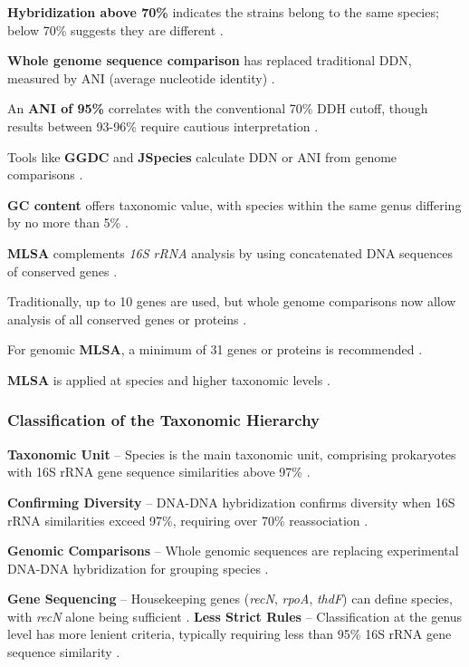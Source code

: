 \textbf{Hybridization above 70\%} indicates the strains belong to the same species; below 70\% suggests they are different \cite*{L3-SeqBasedClass}.

\textbf{Whole genome sequence comparison} has replaced traditional DDN, measured by ANI (average nucleotide identity) \cite*{L3-SeqBasedClass}.

An \textbf{ANI of 95\%} correlates with the conventional 70\% DDH cutoff, though results between 93-96\% require cautious interpretation \cite*{L3-SeqBasedClass}.

Tools like \textbf{GGDC} and \textbf{JSpecies} calculate DDN or ANI from genome comparisons \cite*{L3-SeqBasedClass}.

\textbf{GC content} offers taxonomic value, with species within the same genus differing by no more than 5\% \cite*{L3-SeqBasedClass}.

\textbf{MLSA} complements \textit{16S rRNA} analysis by using concatenated DNA sequences of conserved genes \cite*{L3-SeqBasedClass}.

Traditionally, up to 10 genes are used, but whole genome comparisons now allow analysis of all conserved genes or proteins \cite*{L3-SeqBasedClass}.

For genomic \textbf{MLSA}, a minimum of 31 genes or proteins is recommended \cite*{L3-SeqBasedClass}.

\textbf{MLSA} is applied at species and higher taxonomic levels \cite*{L3-SeqBasedClass}.
\subsubsection{Classification of the Taxonomic Hierarchy}

\textbf{Taxonomic Unit} – Species is the main taxonomic unit, comprising prokaryotes with 16S rRNA gene sequence similarities above 97\% \cite*{L3-SeqBasedClass}.

\textbf{Confirming Diversity} – DNA-DNA hybridization confirms diversity when 16S rRNA similarities exceed 97\%, requiring over 70\% reassociation \cite*{L3-SeqBasedClass}.

\textbf{Genomic Comparisons} – Whole genomic sequences are replacing experimental DNA-DNA hybridization for grouping species \cite*{L3-SeqBasedClass}.

\textbf{Gene Sequencing} – Housekeeping genes (\textit{recN}, \textit{rpoA}, \textit{thdF}) can define species, with \textit{recN} alone being sufficient \cite*{L3-SeqBasedClass}.
\textbf{Less Strict Rules} – Classification at the genus level has more lenient criteria, typically requiring less than 95\% 16S rRNA gene sequence similarity \cite*{L3-SeqBasedClass}.

